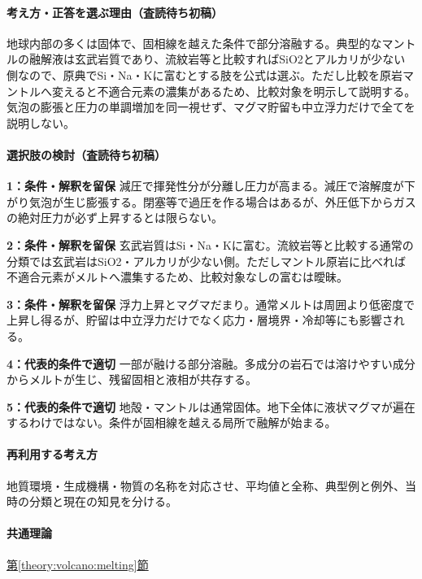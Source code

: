 \paragraph{考え方・正答を選ぶ理由（査読待ち初稿）} 地球内部の多くは固体で、固相線を越えた条件で部分溶融する。典型的なマントルの融解液は玄武岩質であり、流紋岩等と比較すればSiO2とアルカリが少ない側なので、原典でSi・Na・Kに富むとする肢を公式は選ぶ。ただし比較を原岩マントルへ変えると不適合元素の濃集があるため、比較対象を明示して説明する。気泡の膨張と圧力の単調増加を同一視せず、マグマ貯留も中立浮力だけで全てを説明しない。

\paragraph{選択肢の検討（査読待ち初稿）}\mbox{}\par

\noindent\textbf{1：条件・解釈を留保} 減圧で揮発性分が分離し圧力が高まる。減圧で溶解度が下がり気泡が生じ膨張する。閉塞等で過圧を作る場合はあるが、外圧低下からガスの絶対圧力が必ず上昇するとは限らない。\par

\noindent\textbf{2：条件・解釈を留保} 玄武岩質はSi・Na・Kに富む。流紋岩等と比較する通常の分類では玄武岩はSiO2・アルカリが少ない側。ただしマントル原岩に比べれば不適合元素がメルトへ濃集するため、比較対象なしの富むは曖昧。\par

\noindent\textbf{3：条件・解釈を留保} 浮力上昇とマグマだまり。通常メルトは周囲より低密度で上昇し得るが、貯留は中立浮力だけでなく応力・層境界・冷却等にも影響される。\par

\noindent\textbf{4：代表的条件で適切} 一部が融ける部分溶融。多成分の岩石では溶けやすい成分からメルトが生じ、残留固相と液相が共存する。\par

\noindent\textbf{5：代表的条件で適切} 地殻・マントルは通常固体。地下全体に液状マグマが遍在するわけではない。条件が固相線を越える局所で融解が始まる。\par

\paragraph{再利用する考え方} 地質環境・生成機構・物質の名称を対応させ、平均値と全称、典型例と例外、当時の分類と現在の知見を分ける。

\paragraph{共通理論} \hyperref[theory:volcano:melting]{第\ref*{theory:volcano:melting}節}

